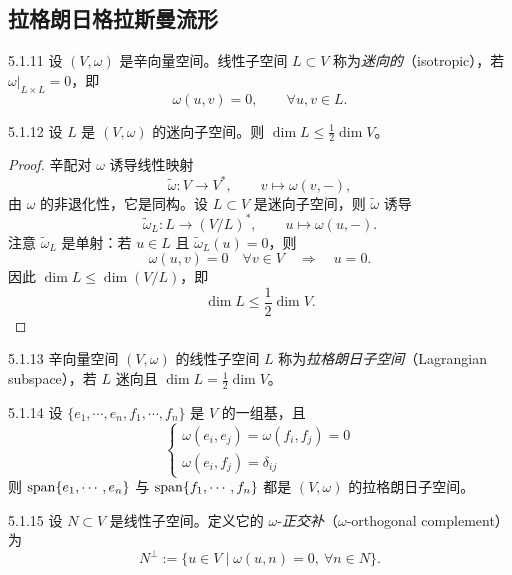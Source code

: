 \subsection{拉格朗日格拉斯曼流形}

\begin{definition}{5.1.11}
设 $(V,\omega)$ 是辛向量空间。线性子空间 $L\subset V$ 称为\emph{迷向的}（isotropic），若 $\omega|_{L\times L}=0$，即
\[
\omega(u,v)=0,\qquad \forall u,v\in L.
\]
\end{definition}

\begin{proposition}{5.1.12}
设 $L$ 是 $(V,\omega)$ 的迷向子空间。则 $\dim L\le\frac12\dim V$。
\end{proposition}


\begin{proof}
辛配对 $\omega$ 诱导线性映射
\[
\tilde\omega:V\longrightarrow V^*,\qquad v\longmapsto\omega(v,-),
\]
由 $\omega$ 的非退化性，它是同构。设 $L\subset V$ 是迷向子空间，则 $\tilde\omega$ 诱导
\[
\tilde\omega_L:L\longrightarrow(V/L)^*,\qquad u\longmapsto\omega(u,-).
\]
注意 $\tilde\omega_L$ 是单射：若 $u\in L$ 且 $\tilde\omega_L(u)=0$，则
\[
\omega(u,v)=0\quad\forall v\in V\quad\Longrightarrow\quad u=0.
\]
因此 $\dim L\le\dim(V/L)$，即
\[
\dim L\le\frac12\dim V.
\]
\end{proof}

\begin{definition}{5.1.13}
辛向量空间 $(V,\omega)$ 的线性子空间 $L$ 称为\emph{拉格朗日子空间}（Lagrangian subspace），若 $L$ 迷向且 $\dim L=\frac12\dim V$。
\end{definition}

\begin{example}{5.1.14}
设 $\{e_1,\cdots,e_n,f_1,\cdots,f_n\}$ 是 $V$ 的一组基，且
\[
\begin{cases}
\omega(e_i,e_j)=\omega(f_i,f_j)=0\\[2pt]
\omega(e_i,f_j)=\delta_{ij}
\end{cases}
\]
则 $\operatorname{span}\{e_1,\cdots,e_n\}$ 与 $\operatorname{span}\{f_1,\cdots,f_n\}$ 都是 $(V,\omega)$ 的拉格朗日子空间。
\end{example}

\begin{definition}{5.1.15}
设 $N\subset V$ 是线性子空间。定义它的 $\omega$-\emph{正交补}（$\omega$-orthogonal complement）为
\[
N^\perp:=\{u\in V\mid \omega(u,n)=0,\ \forall n\in N\}.
\]
\end{definition}

